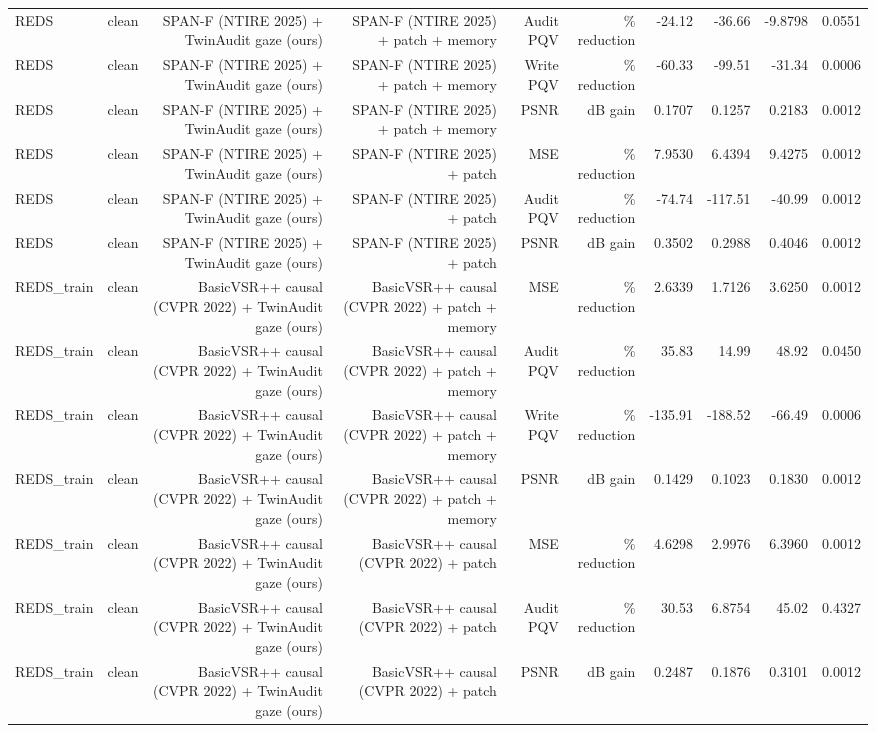 \begin{table}[t]
\begin{tabular}{llrrrrrrrr}
REDS & clean & SPAN-F (NTIRE 2025) + TwinAudit gaze (ours) & SPAN-F (NTIRE 2025) + patch + memory & Audit PQV & \% reduction & -24.12 & -36.66 & -9.8798 & 0.0551 \\
REDS & clean & SPAN-F (NTIRE 2025) + TwinAudit gaze (ours) & SPAN-F (NTIRE 2025) + patch + memory & Write PQV & \% reduction & -60.33 & -99.51 & -31.34 & 0.0006 \\
REDS & clean & SPAN-F (NTIRE 2025) + TwinAudit gaze (ours) & SPAN-F (NTIRE 2025) + patch + memory & PSNR & dB gain & 0.1707 & 0.1257 & 0.2183 & 0.0012 \\
REDS & clean & SPAN-F (NTIRE 2025) + TwinAudit gaze (ours) & SPAN-F (NTIRE 2025) + patch & MSE & \% reduction & 7.9530 & 6.4394 & 9.4275 & 0.0012 \\
REDS & clean & SPAN-F (NTIRE 2025) + TwinAudit gaze (ours) & SPAN-F (NTIRE 2025) + patch & Audit PQV & \% reduction & -74.74 & -117.51 & -40.99 & 0.0012 \\
REDS & clean & SPAN-F (NTIRE 2025) + TwinAudit gaze (ours) & SPAN-F (NTIRE 2025) + patch & PSNR & dB gain & 0.3502 & 0.2988 & 0.4046 & 0.0012 \\
REDS\_train & clean & BasicVSR++ causal (CVPR 2022) + TwinAudit gaze (ours) & BasicVSR++ causal (CVPR 2022) + patch + memory & MSE & \% reduction & 2.6339 & 1.7126 & 3.6250 & 0.0012 \\
REDS\_train & clean & BasicVSR++ causal (CVPR 2022) + TwinAudit gaze (ours) & BasicVSR++ causal (CVPR 2022) + patch + memory & Audit PQV & \% reduction & 35.83 & 14.99 & 48.92 & 0.0450 \\
REDS\_train & clean & BasicVSR++ causal (CVPR 2022) + TwinAudit gaze (ours) & BasicVSR++ causal (CVPR 2022) + patch + memory & Write PQV & \% reduction & -135.91 & -188.52 & -66.49 & 0.0006 \\
REDS\_train & clean & BasicVSR++ causal (CVPR 2022) + TwinAudit gaze (ours) & BasicVSR++ causal (CVPR 2022) + patch + memory & PSNR & dB gain & 0.1429 & 0.1023 & 0.1830 & 0.0012 \\
REDS\_train & clean & BasicVSR++ causal (CVPR 2022) + TwinAudit gaze (ours) & BasicVSR++ causal (CVPR 2022) + patch & MSE & \% reduction & 4.6298 & 2.9976 & 6.3960 & 0.0012 \\
REDS\_train & clean & BasicVSR++ causal (CVPR 2022) + TwinAudit gaze (ours) & BasicVSR++ causal (CVPR 2022) + patch & Audit PQV & \% reduction & 30.53 & 6.8754 & 45.02 & 0.4327 \\
REDS\_train & clean & BasicVSR++ causal (CVPR 2022) + TwinAudit gaze (ours) & BasicVSR++ causal (CVPR 2022) + patch & PSNR & dB gain & 0.2487 & 0.1876 & 0.3101 & 0.0012 \\

\end{tabular}
\end{table}

